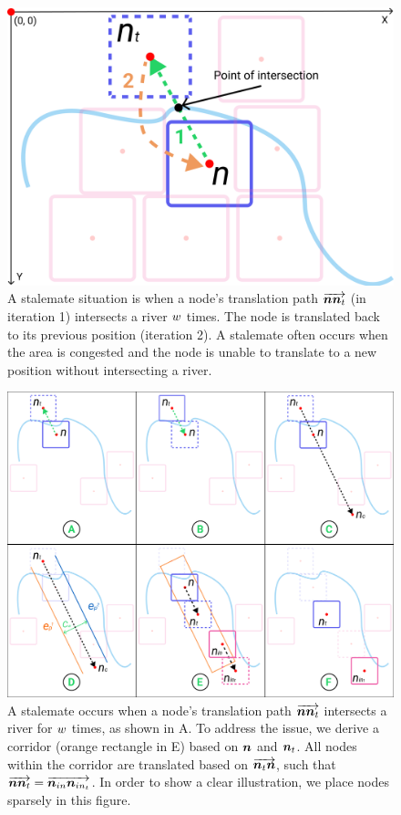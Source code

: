 {
\begin{figure}[tb!]
    \centering
    \includegraphics[width=\columnwidth]{figure/stalemate.png}
    \caption{A stalemate situation is when a node's translation path $ \protect\overrightarrow{\bm{n}\bm{n}_t} $ (in iteration 1) intersects a river $ w $ times. The node is translated back to its previous position (iteration 2). A stalemate often occurs when the area is congested and the node is unable to translate to a new position without intersecting a river.}
    \label{fig:stalemate}
\end{figure}
}

{
\begin{figure}[tb!]
    \centering
    \includegraphics[width=\columnwidth]{figure/corridor.png}
    \caption{A stalemate occurs when a node's translation path $ \protect\overrightarrow{\bm{n}\bm{n}_t} $ intersects a river for $ w $ times, as shown in A. To address the issue, we derive a corridor (orange rectangle in E) based on $ \bm{n} $ and $ \bm{n}_t $. All nodes within the corridor are translated based on $ \protect\overrightarrow{\bm{n}_t\bm{n}} $, such that $ \protect\overrightarrow{\bm{n}\bm{n}_{t}} = \protect\overrightarrow{\bm{n}_{in}\bm{n}_{in_t}} $. In order to show a clear illustration, we place nodes sparsely in this figure.}
    \label{fig:corridor}
\end{figure}
}

